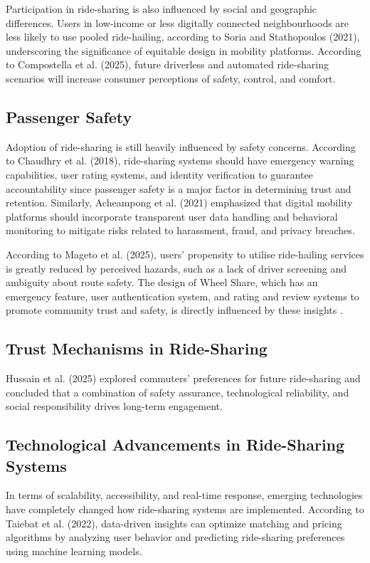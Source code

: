 Participation in ride-sharing is also influenced by social and geographic differences. Users in low-income or less digitally connected neighbourhoods are less likely to use pooled ride-hailing, according to Soria and Stathopoulos (2021), underscoring the significance of equitable design in mobility platforms\cite{soria2021}. According to Compostella et al. (2025), future driverless and automated ride-sharing scenarios will increase consumer perceptions of safety, control, and comfort\cite{compostella2025}.


\subsection{Passenger Safety }
Adoption of ride-sharing is still heavily influenced by safety concerns. According to Chaudhry et al. (2018), ride-sharing systems should have emergency warning capabilities, user rating systems, and identity verification to guarantee accountability since passenger safety is a major factor in determining trust and retention\cite{chaudhry2018}.
Similarly, Acheampong et al. (2021) emphasized that digital mobility platforms should incorporate transparent user data handling and behavioral monitoring to mitigate risks related to harassment, fraud, and privacy breaches\cite{acheampong2021}. 

According to Mageto et al. (2025), users' propensity to utilise ride-hailing services is greatly reduced by perceived hazards, such as a lack of driver screening and ambiguity about route safety. The design of Wheel Share, which has an emergency feature, user authentication system, and rating and review systems to promote community trust and safety, is directly influenced by these insights
\cite{mageto2025}.

\subsection{Trust Mechanisms in Ride-Sharing}
Hussain et al. (2025) explored commuters’ preferences for future ride-sharing and concluded that a combination of safety assurance, technological reliability, and social responsibility drives long-term engagement\cite{hussain2025}.

\subsection{Technological Advancements in Ride-Sharing Systems}
In terms of scalability, accessibility, and real-time response, emerging technologies have completely changed how ride-sharing systems are implemented. According to Taiebat et al. (2022), data-driven insights can optimize matching and pricing algorithms by analyzing user behavior and predicting ride-sharing preferences using machine learning models\cite{taiebat2022}.

